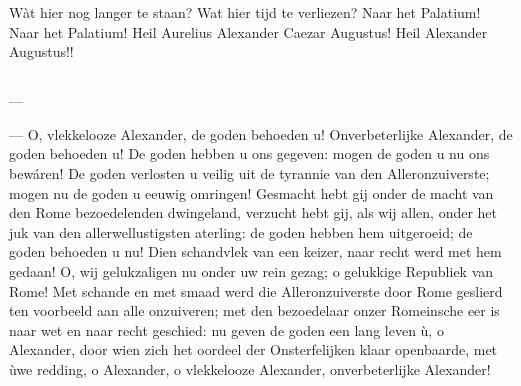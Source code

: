 \documentclass[a4paper, 12pt, oneside, dutch]{article}
\begin{document}
Wàt hier nog langer te staan? Wat hier tijd te verliezen? Naar het Palatium! Naar het Palatium! Heil Aurelius Alexander Caezar Augustus! Heil Alexander Augustus!!

\subsection{}
\paragraph{}
---

--- O, vlekkelooze Alexander, de goden behoeden u! Onverbeterlijke Alexander, de goden behoeden u! De goden hebben u ons gegeven: mogen de goden u nu ons bewáren! De goden verlosten u veilig uit de tyrannie van den Alleronzuiverste; mogen nu de goden u eeuwig omringen! Gesmacht hebt gij onder de macht van den Rome bezoedelenden dwingeland, verzucht hebt gij, als wij allen, onder het juk van den allerwellustigsten aterling: de goden hebben hem uitgeroeid; de goden behoeden u nu! Dien schandvlek van een keizer, naar recht werd met hem gedaan! O, wij gelukzaligen nu onder uw rein gezag; o gelukkige Republiek van Rome! Met schande en met smaad werd die Alleronzuiverste door Rome geslierd ten voorbeeld aan alle onzuiveren; met den bezoedelaar onzer Romeinsche eer is naar wet en naar recht geschied: nu geven de goden een lang leven ù, o Alexander, door wien zich het oordeel der Onsterfelijken klaar openbaarde, met ùwe redding, o Alexander, o vlekkelooze Alexander, onverbeterlijke Alexander!
\end{document}
